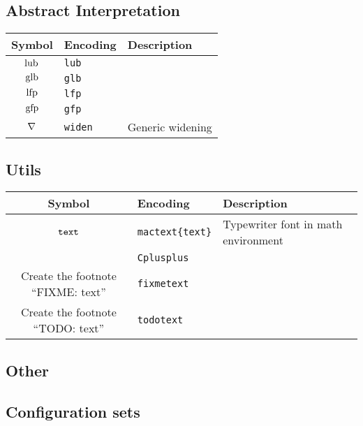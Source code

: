 \documentclass[11pt]{article}
\begin{document}
\subsection{Abstract Interpretation}

\begin{table}[H]
	\def\arraystretch{1.5}
	\begin{tabular}{c l l}
		\textbf{Symbol} & \textbf{Encoding} & \textbf{Description} \\
		\hline
		$\mathop{\mathrm{lub}}\nolimits$ & \texttt{lub} &  \\
		$\mathop{\mathrm{glb}}\nolimits$ & \texttt{glb} &  \\
		$\mathop{\mathrm{lfp}}\nolimits$ & \texttt{lfp} &  \\
		$\mathop{\mathrm{gfp}}\nolimits$ & \texttt{gfp} &  \\
		$\mathbin{\nabla}$ & \texttt{widen} & Generic widening \\
	\end{tabular} 
\end{table}


\subsection{Utils}

\begin{table}[H]
	\def\arraystretch{1.5}
	\begin{tabular}{c l l}
		\textbf{Symbol} & \textbf{Encoding} & \textbf{Description} \\
		\hline 
		$\text{\texttt{text}}$ & \texttt{mactext\{text\}} & Typewriter font in math environment \\
		\Cplusplus & \texttt{Cplusplus} &  \\
		Create the footnote ``FIXME: text'' & \texttt{fixme{text}} & \\
		Create the footnote ``TODO: text'' & \texttt{todo{text}} & \\
	\end{tabular} 
\end{table}


\subsection{Other}

\subsection{Configuration sets}
\end{document}
